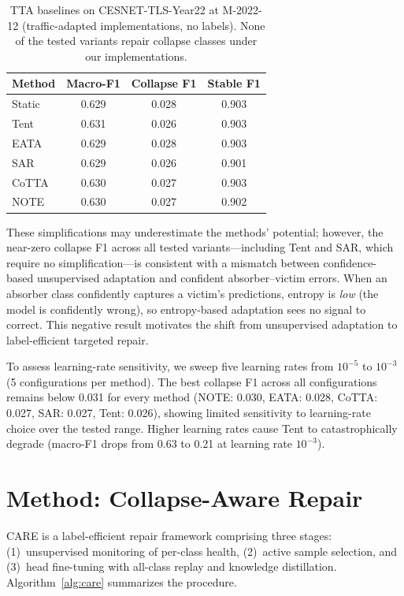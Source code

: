 \documentclass[journal]{IEEEtran}
\newcommand{\ours}{CARE}  %
\begin{document}
\begin{table}[!htbp]
\centering
\caption{TTA baselines on CESNET-TLS-Year22 at M-2022-12 (traffic-adapted implementations, no labels). None of the tested variants repair collapse classes under our implementations.}
\label{tab:tta}
\small
\begin{tabular}{@{}l ccc@{}}
\toprule
Method & Macro-F1 & Collapse F1 & Stable F1 \\
\midrule
Static      & 0.629 & 0.028 & 0.903 \\
Tent        & 0.631 & 0.026 & 0.903 \\
EATA        & 0.629 & 0.028 & 0.903 \\
SAR         & 0.629 & 0.026 & 0.901 \\
CoTTA       & 0.630 & 0.027 & 0.903 \\
NOTE        & 0.630 & 0.027 & 0.902 \\
\bottomrule
\end{tabular}
\end{table}

These simplifications may underestimate the methods' potential; however, the near-zero collapse F1 across all tested variants---including Tent and SAR, which require no simplification---is consistent with a mismatch between confidence-based unsupervised adaptation and confident absorber--victim errors.
When an absorber class confidently captures a victim's predictions, entropy is \textit{low} (the model is confidently wrong), so entropy-based adaptation sees no signal to correct.
This negative result motivates the shift from unsupervised adaptation to label-efficient targeted repair.

To assess learning-rate sensitivity, we sweep five learning rates from $10^{-5}$ to $10^{-3}$ (5 configurations per method).
The best collapse F1 across all configurations remains below 0.031 for every method (NOTE: 0.030, EATA: 0.028, CoTTA: 0.027, SAR: 0.027, Tent: 0.026), showing limited sensitivity to learning-rate choice over the tested range.
Higher learning rates cause Tent to catastrophically degrade (macro-F1 drops from 0.63 to 0.21 at learning rate $10^{-3}$).

\section{Method: Collapse-Aware Repair}
\label{sec:method}

\ours{} is a label-efficient repair framework comprising three stages: (1)~unsupervised monitoring of per-class health, (2)~active sample selection, and (3)~head fine-tuning with all-class replay and knowledge distillation.
Algorithm~\ref{alg:care} summarizes the procedure.
\end{document}
